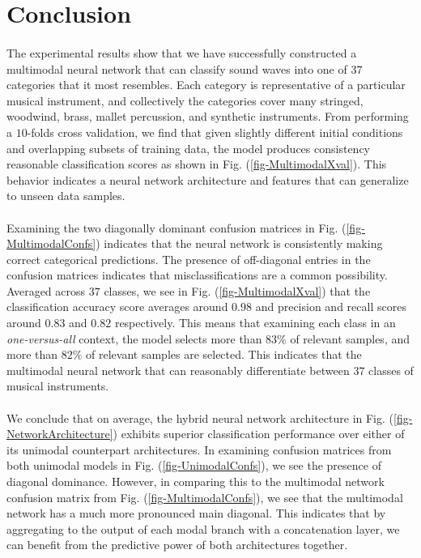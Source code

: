 \documentclass[12pt,letterpaper]{article}
\begin{document}

\newpage
\section{Conclusion}
\label{sec-Conclusion}

\paragraph*{}The experimental results show that we have successfully constructed a multimodal neural network that can classify sound waves into one of $37$ categories that it most resembles. Each category is representative of a particular musical instrument, and collectively the categories cover many stringed, woodwind, brass, mallet percussion, and synthetic instruments. From performing a $10$-folds cross validation, we find that given slightly different initial conditions and overlapping subsets of training data, the model produces consistency reasonable classification scores as shown in Fig. (\ref{fig-MultimodalXval}). This behavior indicates a neural network architecture and features that can generalize to unseen data samples.

\paragraph*{}Examining the two diagonally dominant confusion matrices in Fig. (\ref{fig-MultimodalConfs}) indicates that the neural network is consistently making correct categorical predictions. The presence of off-diagonal entries in the confusion matrices indicates that misclassifications are a common possibility. Averaged across $37$ classes, we see in Fig. (\ref{fig-MultimodalXval}) that the classification accuracy score averages around $0.98$ and precision and recall scores around $0.83$ and $0.82$ respectively. This means that examining each class in an \textit{one-versus-all} context, the model selects more than $83\%$ of relevant samples, and more than $82\%$ of relevant samples are selected. This indicates that the multimodal neural network that can reasonably differentiate between $37$ classes of musical instruments.

\paragraph*{}We conclude that on average, the hybrid neural network architecture in Fig. (\ref{fig-NetworkArchitecture}) exhibits superior classification performance over either of its unimodal counterpart architectures. In examining confusion matrices from both unimodal models in Fig. (\ref{fig-UnimodalConfs}), we see the presence of diagonal dominance. However, in comparing this to the multimodal network confusion matrix from Fig. (\ref{fig-MultimodalConfs}), we see that the multimodal network has a much more pronounced main diagonal. This indicates that by aggregating to the output of each modal branch with a concatenation layer, we can benefit from the predictive power of both architectures together.
\end{document}
